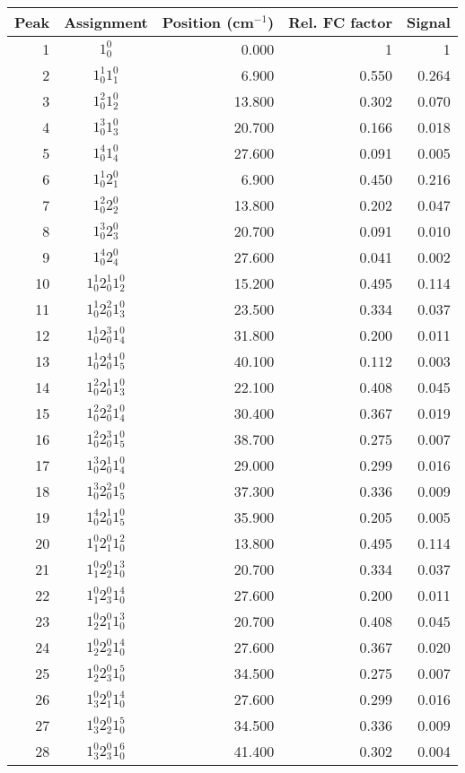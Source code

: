 \documentclass[12pt]{article}
\begin{document}

\renewcommand{\baselinestretch}{1.5}
\begin{table}
\begin{tabular}{rcrrr}
Peak& Assignment&Position (cm$^{-1}$)& Rel. FC factor& Signal\\
\hline
1& $1^0_0$&0.000&1&1\\
2&$1_0^1 1_1^0$& 6.900& 0.550& 0.264\\
3&$1_0^2 1_2^0$& 13.800& 0.302& 0.070\\
4&$1_0^3 1_3^0$& 20.700& 0.166& 0.018\\
5&$1_0^4 1_4^0$& 27.600& 0.091& 0.005\\
6&$1_0^1 2_1^0$& 6.900& 0.450& 0.216\\
7&$1_0^2 2_2^0$& 13.800& 0.202& 0.047\\
8&$1_0^3 2_3^0$& 20.700& 0.091& 0.010\\
9&$1_0^4 2_4^0$& 27.600& 0.041& 0.002\\
10&$1_0^1 2_0^1 1_2^0$& 15.200& 0.495& 0.114\\
11&$1_0^1 2_0^2 1_3^0$& 23.500& 0.334& 0.037\\
12&$1_0^1 2_0^3 1_4^0$& 31.800& 0.200& 0.011\\
13&$1_0^1 2_0^4 1_5^0$& 40.100& 0.112& 0.003\\
14&$1_0^2 2_0^1 1_3^0$& 22.100& 0.408& 0.045\\
15&$1_0^2 2_0^2 1_4^0$& 30.400& 0.367& 0.019\\
16&$1_0^2 2_0^3 1_5^0$& 38.700& 0.275& 0.007\\
17&$1_0^3 2_0^1 1_4^0$& 29.000& 0.299& 0.016\\
18&$1_0^3 2_0^2 1_5^0$& 37.300& 0.336& 0.009\\
19&$1_0^4 2_0^1 1_5^0$& 35.900& 0.205& 0.005\\
20&$1_1^0 2_1^0 1_0^2$& 13.800& 0.495& 0.114\\
21&$1_1^0 2_2^0 1_0^3$& 20.700& 0.334& 0.037\\
22&$1_1^0 2_3^0 1_0^4$& 27.600& 0.200& 0.011\\
23&$1_2^0 2_1^0 1_0^3$& 20.700& 0.408& 0.045\\
24&$1_2^0 2_2^0 1_0^4$& 27.600& 0.367& 0.020\\
25&$1_2^0 2_3^0 1_0^5$& 34.500& 0.275& 0.007\\
26&$1_3^0 2_1^0 1_0^4$& 27.600& 0.299& 0.016\\
27&$1_3^0 2_2^0 1_0^5$& 34.500& 0.336& 0.009\\
28&$1_3^0 2_3^0 1_0^6$& 41.400& 0.302& 0.004\\

\end{tabular}
\end{table}
\end{document}
